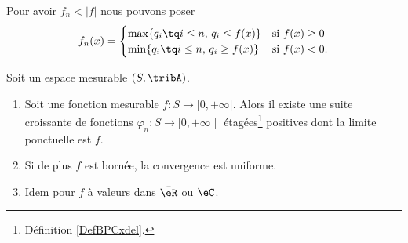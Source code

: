 \begin{remark}
	Pour avoir \(  f_n <| f |\) nous pouvons poser
	\begin{equation}
		f_n(x)=\begin{cases}
			\max\{ q_i\tq i\leq n,\, q_i\leq f(x) \} & \text{si } f(x)\geq 0      \\
			\min\{ q_i\tq i\leq n,\, q_i\geq f(x) \} & \text{si } f(x)< 0\text{.}
		\end{cases}
	\end{equation}
\end{remark}

\begin{theorem}\label{THOooXHIVooKUddLi}
	Soit un espace mesurable \( (S,\tribA)\).
	\begin{enumerate}
		\item
		      Soit une fonction mesurable \( f\colon S\to \mathopen[ 0 , +\infty \mathclose]\). Alors il existe une suite croissante de fonctions \( \varphi_n\colon S\to \mathopen[ 0 , +\infty \mathclose[\) étagées\footnote{Définition \ref{DefBPCxdel}.} positives dont la limite ponctuelle est \( f\).
		\item
		      Si de plus \( f\) est bornée, la convergence est uniforme.
		\item
		      Idem pour \( f\) à valeurs dans \( \bar \eR\) ou \( \eC\).
	\end{enumerate}
\end{theorem}

